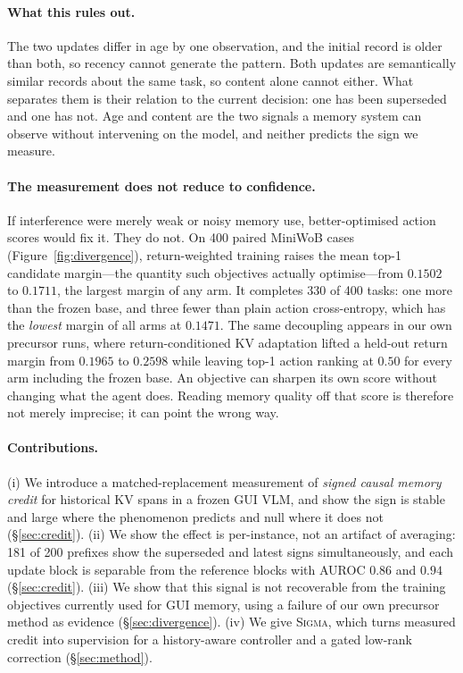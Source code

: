 \documentclass{article}
\newcommand{\method}{\textsc{Sigma}}
\begin{document}


\paragraph{What this rules out.}
The two updates differ in age by one observation, and the initial record is
older than both, so recency cannot generate the pattern. Both updates are
semantically similar records about the same task, so content alone cannot
either. What separates them is their relation to the current decision: one has
been superseded and one has not. Age and content are the two signals a memory
system can observe without intervening on the model, and neither predicts the
sign we measure.

\paragraph{The measurement does not reduce to confidence.}
If interference were merely weak or noisy memory use, better-optimised action
scores would fix it. They do not. On 400 paired MiniWoB cases
(Figure~\ref{fig:divergence}), return-weighted training raises the mean top-1
candidate margin---the quantity such objectives actually optimise---from
$0.1502$ to $0.1711$, the largest margin of any arm. It completes 330 of 400
tasks: one more than the frozen base, and three fewer than plain action
cross-entropy, which has the \emph{lowest} margin of all arms at $0.1471$. The
same decoupling appears in our own precursor runs, where return-conditioned KV
adaptation lifted a held-out return margin from $0.1965$ to $0.2598$ while
leaving top-1 action ranking at $0.50$ for every arm including the frozen base.
An objective can sharpen its own score without changing what the agent does.
Reading memory quality off that score is therefore not merely imprecise; it can
point the wrong way.

\paragraph{Contributions.}
(i) We introduce a matched-replacement measurement of \emph{signed causal
memory credit} for historical KV spans in a frozen GUI VLM, and show the sign
is stable and large where the phenomenon predicts and null where it does not
(\S\ref{sec:credit}). (ii) We show the effect is per-instance, not an artifact
of averaging: 181 of 200 prefixes show the superseded and latest signs
simultaneously, and each update block is separable from the reference blocks
with AUROC $0.86$ and $0.94$ (\S\ref{sec:credit}). (iii) We show that this
signal is not recoverable from the training objectives currently used for GUI
memory, using a failure of our own precursor method as evidence
(\S\ref{sec:divergence}). (iv) We give \method, which turns measured credit into
supervision for a history-aware controller and a gated low-rank correction
(\S\ref{sec:method}).
\end{document}
